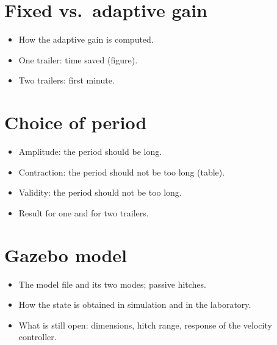 \section{Fixed vs.\ adaptive gain}
\label{sec:sim-adaptive}

\begin{itemize}
  \item How the adaptive gain is computed.
  \item One trailer: time saved (figure).
  \item Two trailers: first minute.
\end{itemize}

\section{Choice of period}
\label{sec:sim-period}

\begin{itemize}
  \item Amplitude: the period should be long.
  \item Contraction: the period should not be too long (table).
  \item Validity: the period should not be too long.
  \item Result for one and for two trailers.
\end{itemize}

\section{Gazebo model}
\label{sec:sim-gazebo}

\begin{itemize}
  \item The model file and its two modes; passive hitches.
  \item How the state is obtained in simulation and in the laboratory.
  \item What is still open: dimensions, hitch range, response of the velocity controller.
\end{itemize}
